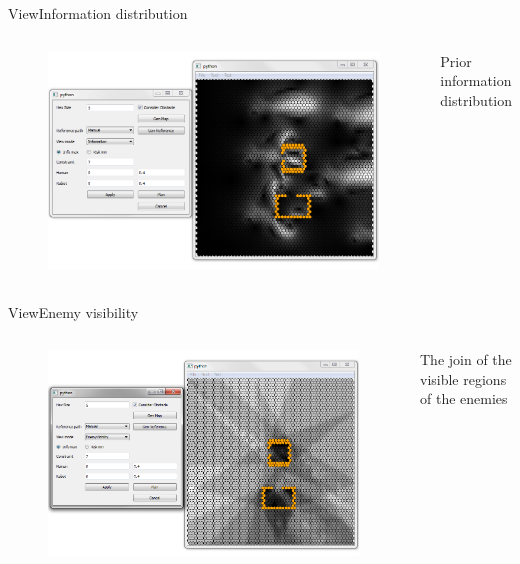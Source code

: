 \begin{frame}{View}{Information distribution}

\begin{columns}
\begin{figure}
\centering
\includegraphics[width = \textwidth]{./screenshot/information_view.png}
\end{figure}

\begin{minipage}{\textwidth}
Prior information distribution
\end{minipage}
\end{columns}

\end{frame}

\begin{frame}{View}{Enemy visibility}

\begin{columns}
\begin{figure}
\centering
\includegraphics[width = \textwidth]{./screenshot/enemy_visibility_view.png}
\end{figure}

\begin{minipage}{\textwidth}
The join of the visible regions of the enemies
\end{minipage}
\end{columns}

\end{frame}

